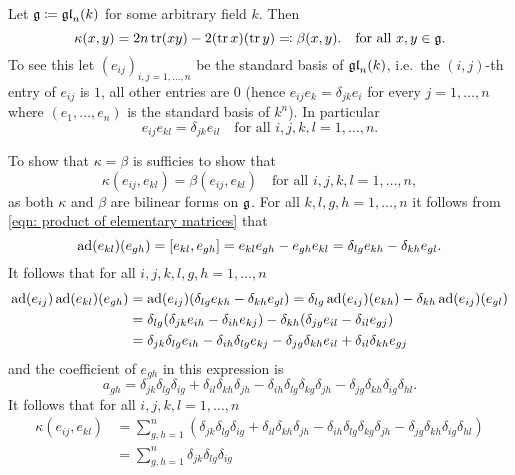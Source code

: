 \begin{expl}\label{expl: Killing form of gl_n}
 Let $\mathfrak{g} \coloneqq \mathfrak{gl}_n(k)$ for some arbitrary field $k$. Then
 \[
  \kappa(x,y) = 2n\operatorname{tr}(xy) - 2(\operatorname{tr} x)(\operatorname{tr} y) \eqqcolon \beta(x,y).
  \quad \text{for all $x,y \in \mathfrak{g}$}.
 \]
 To see this let $(e_{ij})_{i,j=1,\dotsc,n}$ be the standard basis of $\mathfrak{gl}_n(k)$, i.e.\ the $(i,j)$-th entry of $e_{ij}$ is $1$, all other entries are $0$ (hence $e_{ij} e_k = \delta_{jk} e_i$ for every $j = 1, \dotsc, n$ where $(e_1, \dotsc, e_n)$ is the standard basis of $k^n$). In particular
 \begin{equation}\label{eqn: product of elementary matrices}
  e_{ij} e_{kl} = \delta_{jk} e_{il} \quad \text{for all $i,j,k,l = 1, \dotsc, n$}.
 \end{equation}

 To show that $\kappa = \beta$ is sufficies to show that
 \[
  \kappa(e_{ij}, e_{kl}) = \beta(e_{ij}, e_{kl})
  \quad \text{for all $i,j,k,l = 1, \dotsc, n$},
 \]
 as both $\kappa$ and $\beta$ are bilinear forms on $\mathfrak{g}$. For all $k,l,g,h = 1, \dotsc, n$ it follows from \eqref{eqn: product of elementary matrices} that
 \[
  \operatorname{ad}(e_{kl})(e_{gh})
  = [e_{kl}, e_{gh}]
  = e_{kl} e_{gh} - e_{gh} e_{kl}
  = \delta_{lg} e_{kh} - \delta_{kh} e_{gl}.
 \]
 It follows that for all $i,j,k,l,g,h = 1, \dotsc, n$
 \begin{align*}
  \operatorname{ad}(e_{ij})\operatorname{ad}(e_{kl})(e_{gh})
  &= \operatorname{ad}(e_{ij})(\delta_{lg} e_{kh} - \delta_{kh} e_{gl})
  = \delta_{lg} \operatorname{ad}(e_{ij})(e_{kh}) - \delta_{kh} \operatorname{ad}(e_{ij})(e_{gl}) \\
  &= \delta_{lg}(\delta_{jk} e_{ih} - \delta_{ih} e_{kj}) - \delta_{kh}(\delta_{jg} e_{il} - \delta_{il} e_{gj}) \\
  &= \delta_{jk}\delta_{lg} e_{ih} - \delta_{ih} \delta_{lg} e_{kj} - \delta_{jg} \delta_{kh} e_{il} + \delta_{il} \delta_{kh} e_{gj}
 \end{align*}
 and the coefficient of $e_{gh}$ in this expression is
 \[
  a_{gh}
  = \delta_{jk} \delta_{lg} \delta_{ig}
    + \delta_{il} \delta_{kh} \delta_{jh}
    - \delta_{ih} \delta_{lg} \delta_{kg} \delta_{jh}
    - \delta_{jg} \delta_{kh} \delta_{ig} \delta_{hl}.
 \]
 It follows that for all $i,j,k,l = 1, \dotsc, n$
 \begin{align*}
  \kappa(e_{ij}, e_{kl})
  &= \sum_{g,h=1}^n ( \delta_{jk} \delta_{lg} \delta_{ig}
     + \delta_{il} \delta_{kh} \delta_{jh}
     - \delta_{ih} \delta_{lg} \delta_{kg} \delta_{jh}
     - \delta_{jg} \delta_{kh}\delta_{ig} \delta_{hl} ) \\
  &= \sum_{g,h=1}^n \delta_{jk} \delta_{lg} \delta_{ig}

\end{align*}
\end{expl}
